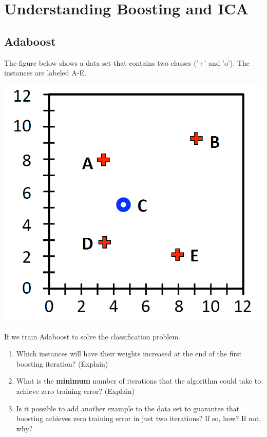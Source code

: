 \section{Understanding Boosting and ICA}


\subsection{Adaboost}

The figure below shows a data set that contains two classes ('+' and 'o'). The instances are labeled A-E.

\begin{center}
\includegraphics[trim={0cm 0 0 0},clip,scale=0.4]{figs/fig1.png}
\end{center}

If we train Adaboost to solve the classification problem.

\begin{enumerate}
    \item Which instances will have their weights increased at the end of the first boosting iteration? (Explain)
    \item What is the \textbf{minimum} number of iterations that the algorithm could take to achieve zero training error? (Explain)
    \item Is it possible to add another example to the data set to guarantee that boosting achieves zero training error in just two iterations? If so, how? If not, why?
\end{enumerate}

